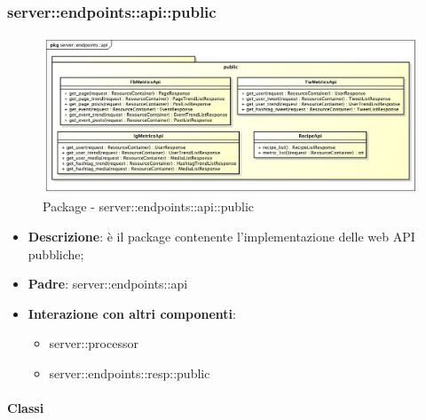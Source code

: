 \subsubsection{server::endpoints::api::public} %
\label{ssub:bdsm_app_server_endpoints_api_public}
\begin{figure}[!htbp]
	\centering
	\centerline{\includegraphics[scale=0.4]{./images/server/api_public.pdf}}
	\caption{Package - server::endpoints::api::public}
\end{figure}

\begin{itemize}
  \item \textbf{Descrizione}: è il package contenente l'implementazione delle web API pubbliche;
  \item \textbf{Padre}: server::endpoints::api
  \item \textbf{Interazione con altri componenti}:
  	\begin{itemize}
        \item server::processor
				\item server::endpoints::resp::public
    \end{itemize}
\end{itemize}

	\paragraph{Classi} %

